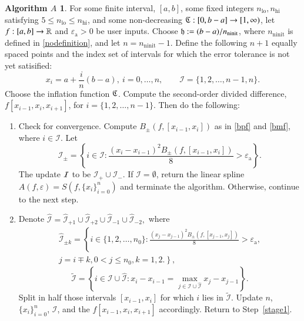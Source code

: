 \documentclass[review]{elsarticle}
\newcommand{\abstol}{\varepsilon_{\textrm{a}}}
\theoremstyle{definition}
\newtheorem*{algoA}{Algorithm $A$}
\DeclareMathOperator{\lo}{lo}
\DeclareMathOperator{\ninit}{ninit}
\begin{document}
\begin{algoA} \label{AlgoA}
For some finite interval, $[a,b]$, some fixed integers $n_{\lo}, n_{\text{hi}}$ satisfying $5 \le n_{\lo} \le n_{\text{hi}}$, and some non-decreasing
$\mathfrak{C}:[0,b-a] \to [1, \infty)$, let $f:[a,b] \to \mathbb{R}$ and $\abstol >0$ be
user inputs. Choose $\fh := (b-a)/n_{\ninit}$, where $n_{\ninit}$ is defined in \eqref{nodefinition}, and let  $n=n_{\ninit}-1$.
Define the
following $n+1$ equally spaced points and the index set of intervals for which the error tolerance
is not yet satisified:
$$x_i=a+\frac{i}{n}(b-a), \ i=0,\ldots,n, \qquad
\mathcal{I} = \{1,2,\ldots,n-1,n\}.$$
Choose the inflation function $\mathfrak{C}$. Compute the second-order divided difference, $f[x_{i-1},
x_{i}, x_{i+1}]$, for $i = \{1,2,\ldots,n-1\}$. Then do the
following:
\begin{enumerate}[\bf Step 1.]%
\item \label{stage1} Check for convergence.
Compute $B_\pm(f,[x_{i-1},x_i])$ as in \eqref{bpf} and \eqref{bmf}, where $i \in \mathcal{I}$.
Let
\[
\mathcal{I}_\pm = \left\{i \in \mathcal{I}: \frac{(x_i - x_{i-1})^2B_\pm(f,[x_{i-1},x_i])}{8}  > \abstol \right\}.
\]
The update $\mathcal{I}$ to be $\mathcal{I}_+ \cup \mathcal{I}_-$.  If $\mathcal{I} = \emptyset$, return the linear spline $A(f,\varepsilon) = S(f, \{x_i\}_{i=0}^n)$ and terminate the algorithm.
Otherwise, continue to the next step.
\item \label{stage2}
Denote $\widehat{\mathcal{I}}=\widehat{\mathcal{I}}_{+1} \cup \widehat{\mathcal{I}}_{+2} \cup \widehat{\mathcal{I}}_{-1} \cup \widehat{\mathcal{I}}_{-2},$ where
\begin{multline*}
\widehat{\mathcal{I}}_{\pm k} = \left\{i \in \{1,2,\ldots,n_0\}: \frac{(x_j - x_{j-1})^2B_\pm(f,[x_{j-1},x_j])}{8}  > \abstol,\right.\\
 \left.j=i\mp k, 0<j\le n_0, k=1,2. \right\},
\end{multline*}
\[\widetilde{\mathcal{I}}=\left\{i \in \mathcal{I} \cup \widehat{\mathcal{I}}: x_i - x_{i-1}=\max\limits_{j \in \mathcal{I} \cup \widehat{\mathcal{I}} } x_j-x_{j-1} \right\}.\]
Split in half those intervals $[x_{i-1},x_i]$ for which $i$ lies in $\widetilde{\mathcal{I}}$.
Update $n$, $\{x_i\}_{i=0}^n$, $\mathcal{I}$, and the $f[x_{i-1}, x_{i}, x_{i+1}]$ accordingly.  Return to Step~\ref{stage1}.
\end{enumerate}
\end{algoA}
\end{document}
